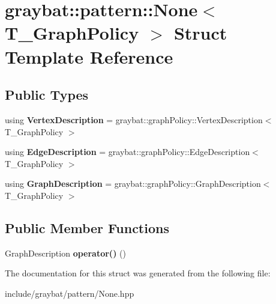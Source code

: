 \hypertarget{structgraybat_1_1pattern_1_1None}{}\section{graybat\+:\+:pattern\+:\+:None$<$ T\+\_\+\+Graph\+Policy $>$ Struct Template Reference}
\label{structgraybat_1_1pattern_1_1None}
\subsection*{Public Types}
\begin{DoxyCompactItemize}
\item 
\hypertarget{structgraybat_1_1pattern_1_1None_aa68777cb73830f14936a1dc8cca147a3}{}using {\bfseries Vertex\+Description} = graybat\+::graph\+Policy\+::\+Vertex\+Description$<$ T\+\_\+\+Graph\+Policy $>$\label{structgraybat_1_1pattern_1_1None_aa68777cb73830f14936a1dc8cca147a3}

\item 
\hypertarget{structgraybat_1_1pattern_1_1None_a7d0b05e8b896bae79b391a9d5e26b808}{}using {\bfseries Edge\+Description} = graybat\+::graph\+Policy\+::\+Edge\+Description$<$ T\+\_\+\+Graph\+Policy $>$\label{structgraybat_1_1pattern_1_1None_a7d0b05e8b896bae79b391a9d5e26b808}

\item 
\hypertarget{structgraybat_1_1pattern_1_1None_afd2fe15579fadeb0a09f5055dc44d6eb}{}using {\bfseries Graph\+Description} = graybat\+::graph\+Policy\+::\+Graph\+Description$<$ T\+\_\+\+Graph\+Policy $>$\label{structgraybat_1_1pattern_1_1None_afd2fe15579fadeb0a09f5055dc44d6eb}

\end{DoxyCompactItemize}
\subsection*{Public Member Functions}
\begin{DoxyCompactItemize}
\item 
\hypertarget{structgraybat_1_1pattern_1_1None_ac5186ec6bd64f2cf33402af7b3adf96f}{}Graph\+Description {\bfseries operator()} ()\label{structgraybat_1_1pattern_1_1None_ac5186ec6bd64f2cf33402af7b3adf96f}

\end{DoxyCompactItemize}


The documentation for this struct was generated from the following file\+:\begin{DoxyCompactItemize}
\item 
include/graybat/pattern/None.\+hpp\end{DoxyCompactItemize}
